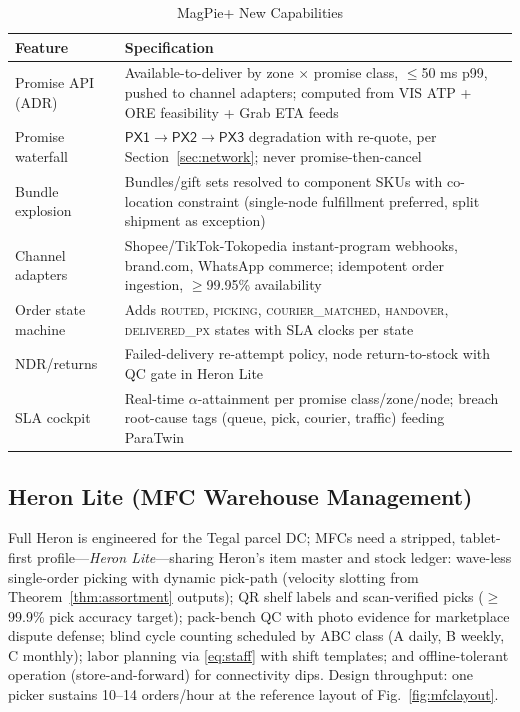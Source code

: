 \documentclass[journal]{IEEEtran}
\begin{document}
\begin{table}[!t]
\caption{MagPie+ New Capabilities}
\label{tab:magpie}
\centering
\scriptsize
\begin{tabularx}{\columnwidth}{@{}l X@{}}
\toprule
\textbf{Feature} & \textbf{Specification} \\
\midrule
Promise API (ADR) & Available-to-deliver by zone $\times$ promise class, $\le$50 ms p99, pushed to channel adapters; computed from VIS ATP + ORE feasibility + Grab ETA feeds \\
Promise waterfall & $\mathsf{PX1} \to \mathsf{PX2} \to \mathsf{PX3}$ degradation with re-quote, per Section~\ref{sec:network}; never promise-then-cancel \\
Bundle explosion & Bundles/gift sets resolved to component SKUs with co-location constraint (single-node fulfillment preferred, split shipment as exception) \\
Channel adapters & Shopee/TikTok-Tokopedia instant-program webhooks, brand.com, WhatsApp commerce; idempotent order ingestion, $\ge$99.95\% availability \\
Order state machine & Adds \textsc{routed}, \textsc{picking}, \textsc{courier\_matched}, \textsc{handover}, \textsc{delivered\_px} states with SLA clocks per state \\
NDR/returns & Failed-delivery re-attempt policy, node return-to-stock with QC gate in Heron Lite \\
SLA cockpit & Real-time $\alpha$-attainment per promise class/zone/node; breach root-cause tags (queue, pick, courier, traffic) feeding ParaTwin \\
\bottomrule
\end{tabularx}
\end{table}

\subsection{Heron Lite (MFC Warehouse Management)}
Full Heron is engineered for the Tegal parcel DC; MFCs need a stripped, tablet-first profile---\emph{Heron Lite}---sharing Heron's item master and stock ledger: wave-less single-order picking with dynamic pick-path (velocity slotting from Theorem~\ref{thm:assortment} outputs); QR shelf labels and scan-verified picks ($\ge$99.9\% pick accuracy target); pack-bench QC with photo evidence for marketplace dispute defense; blind cycle counting scheduled by ABC class (A daily, B weekly, C monthly); labor planning via \eqref{eq:staff} with shift templates; and offline-tolerant operation (store-and-forward) for connectivity dips. Design throughput: one picker sustains 10--14 orders/hour at the reference layout of Fig.~\ref{fig:mfclayout}.
\end{document}
